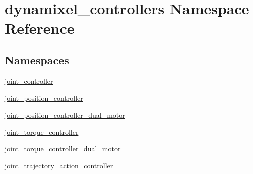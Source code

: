 \hypertarget{namespacedynamixel__controllers}{}\section{dynamixel\+\_\+controllers Namespace Reference}
\label{namespacedynamixel__controllers}
\subsection*{Namespaces}
\begin{DoxyCompactItemize}
\item 
 \hyperlink{namespacedynamixel__controllers_1_1joint__controller}{joint\+\_\+controller}
\item 
 \hyperlink{namespacedynamixel__controllers_1_1joint__position__controller}{joint\+\_\+position\+\_\+controller}
\item 
 \hyperlink{namespacedynamixel__controllers_1_1joint__position__controller__dual__motor}{joint\+\_\+position\+\_\+controller\+\_\+dual\+\_\+motor}
\item 
 \hyperlink{namespacedynamixel__controllers_1_1joint__torque__controller}{joint\+\_\+torque\+\_\+controller}
\item 
 \hyperlink{namespacedynamixel__controllers_1_1joint__torque__controller__dual__motor}{joint\+\_\+torque\+\_\+controller\+\_\+dual\+\_\+motor}
\item 
 \hyperlink{namespacedynamixel__controllers_1_1joint__trajectory__action__controller}{joint\+\_\+trajectory\+\_\+action\+\_\+controller}
\end{DoxyCompactItemize}
